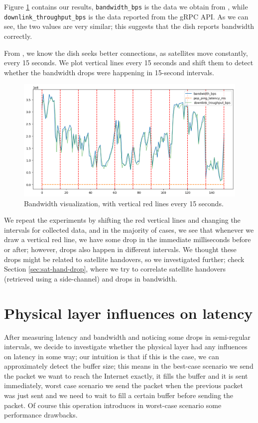 \documentclass[IN,11pt,twoside,openright,idp,english]{tumthesis}
\begin{document}
Figure \ref{fig:vis-bw-15sec} contains our results, \texttt{bandwidth\_bps} is the data we obtain from , while \texttt{downlink\_throughput\_bps} is the data reported from the gRPC API. As we can see, the two values are very similar; this suggests that the dish reports bandwidth correctly.

From \cite{llc-application}, we know the dish seeks better connections, as satellites move constantly, every 15 seconds. We plot vertical lines every 15 seconds and shift them to detect whether the bandwidth drops were happening in 15-second intervals.

\begin{figure}
    \centering
    \includegraphics[width=1.0\columnwidth]{img/bw-15seconds.png}
    \caption{Bandwidth visualization, with vertical red lines every 15 seconds.}
    \label{fig:vis-bw-15sec}
\end{figure}

We repeat the experiments by shifting the red vertical lines and changing the intervals for collected data, and in the majority of cases, we see that whenever we draw a vertical red line, we have some drop in the immediate milliseconds before or after; however, drops also happen in different intervals. We thought these drops might be related to satellite handovers, so we investigated further; check Section \ref{sec:sat-hand-drop}, where we try to correlate satellite handovers (retrieved using a side-channel) and drops in bandwidth. 

\section{Physical layer influences on latency}

After measuring latency and bandwidth and noticing some drops in semi-regular intervals, we decide to investigate whether the physical layer had any influences on latency in some way; our intuition is that if this is the case, we can approximately detect the buffer size; this means in the best-case scenario we send the packet we want to reach the Internet exactly, it fills the buffer and it is sent immediately, worst case scenario we send the packet when the previous packet was just sent and we need to wait to fill a certain buffer before sending the packet. Of course this operation introduces in worst-case scenario some performance drawbacks.
\end{document}
